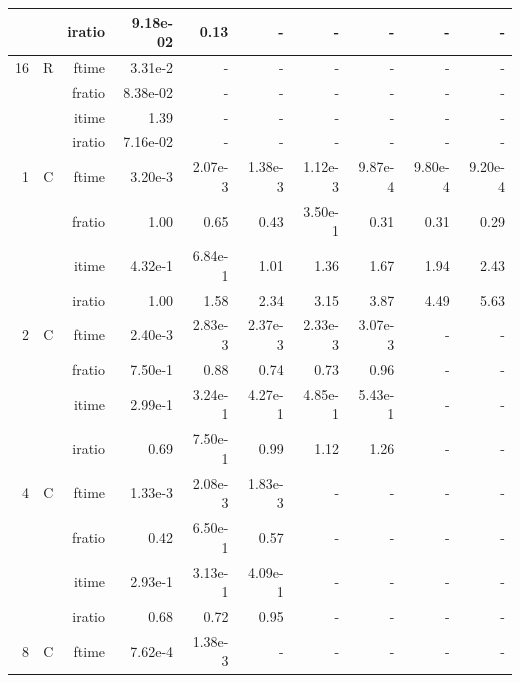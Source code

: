 \documentclass[a4paper]{article}
\begin{document}
\begin{table}[htbp]
\begin{center}
\begin{small}
\begin{tabular}{|r|r|r|r|r|r|r|r|r|r|}
             &             &  iratio &    9.18e-02 &   0.13 &      - &      - &      - &      - &      - \\\hline
   16 &   R &   ftime &    3.31e-2 &      - &      - &      - &      - &      - &      - \\
             &             &  fratio &    8.38e-02 &     - &      - &      - &      - &      - &      - \\
             &             &  itime &    1.39  &      - &      - &      - &      - &      - &      - \\
             &             &  iratio &    7.16e-02 &     - &      - &      - &      - &      - &      - \\\hline\hline
       1 &   C &  ftime &    3.20e-3 &    2.07e-3 &    1.38e-3 &    1.12e-3 &    9.87e-4 &    9.80e-4 &    9.20e-4 \\
             &             &  fratio &    1.00 &    0.65 &    0.43 &    3.50e-1 &   0.31 &   0.31 &   0.29 \\
             &             &  itime &    4.32e-1 &    6.84e-1 &    1.01  &    1.36  &    1.67  &    1.94  &    2.43  \\
             &             &  iratio &    1.00 &    1.58  &    2.34  &   3.15  &   3.87  &    4.49  &    5.63  \\\hline
   2 &  C &  ftime &    2.40e-3 &    2.83e-3 &    2.37e-3 &    2.33e-3 &    3.07e-3 &      - &      - \\
             &             &  fratio &    7.50e-1 &    0.88 &    0.74 &    0.73 &    0.96 &      - &      - \\
             &             &  itime &    2.99e-1 &    3.24e-1 &    4.27e-1 &    4.85e-1 &    5.43e-1 &      - &      - \\
             &             &  iratio &    0.69 &    7.50e-1 &   0.99 &    1.12  &    1.26  &      - &      - \\\hline
   4 &  C &  ftime &    1.33e-3 &    2.08e-3 &    1.83e-3 &      - &      - &      - &      - \\
             &             &  fratio &   0.42 &    6.50e-1 &    0.57 &      - &      - &      - &      - \\
             &             &  itime &    2.93e-1 &    3.13e-1 &    4.09e-1 &      - &      - &      - &      - \\
             &             &  iratio &    0.68 &    0.72 &    0.95 &      - &      - &      - &      - \\\hline
   8 &   C &  ftime &    7.62e-4 &    1.38e-3 &      - &      - &      - &      - &      - \\

\end{tabular}
\end{small}
\end{center}
\end{table}
\end{document}
